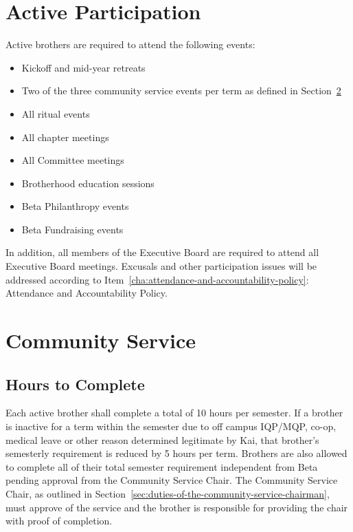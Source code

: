 \section{Active Participation}
\label{sec:active-participation}

Active brothers are required to attend the following events:

\begin{itemize}
	\item Kickoff and mid-year retreats
	\item Two of the three community service events per term as defined
		in Section~\ref{sec:community-service}
	\item All ritual events
	\item All chapter meetings
	\item All Committee meetings
	\item Brotherhood education sessions
	\item Beta Philanthropy events
	\item Beta Fundraising events
\end{itemize}

In addition, all members of the Executive Board are required to attend all
Executive Board meetings.
Excusals and other participation issues will be addressed according to
Item~\ref{cha:attendance-and-accountability-policy}: Attendance and
Accountability Policy.

\section{Community Service}
\label{sec:community-service}

\subsection{Hours to Complete}
\label{sec:hours-to-complete}

Each active brother shall complete a total of 10 hours per semester.
If a brother is inactive for a term within the semester due to off campus
IQP/MQP, co-op, medical leave or other reason determined legitimate by Kai, that
brother’s semesterly requirement is reduced by 5 hours per term.
Brothers are
also allowed to complete all of their total semester requirement independent
from Beta pending approval from the Community Service Chair.
The Community Service Chair, as outlined in
Section~\ref{sec:duties-of-the-community-service-chairman}, must approve of the
service and the brother is responsible for providing the chair with proof of
completion.

